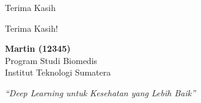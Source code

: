 \documentclass[aspectratio=169]{beamer}
\begin{document}
\begin{frame}{Terima Kasih}
\begin{center}
\Huge Terima Kasih!

\vspace{1cm}

\Large \textbf{Martin (12345)}\\
\normalsize Program Studi Biomedis\\
Institut Teknologi Sumatera

\vspace{1cm}

\normalsize
\textit{``Deep Learning untuk Kesehatan yang Lebih Baik''}
\end{center}
\end{frame}
\end{document}
